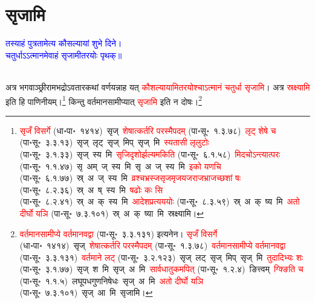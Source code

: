 \section[सृजामि]{सृजामि}
\centering\textcolor{blue}{तस्याहं पुत्रतामेत्य कौसल्यायां शुभे दिने।\nopagebreak\\
चतुर्धाऽऽत्मानमेवाहं सृजामीतरयोः पृथक्॥}\nopagebreak\\
\\
\fontsize{14}{21}\selectfont\begin{sloppypar}\justifying\noindent\hspace{10mm} अत्र भगवाञ्छ्रीरामभद्रोऽवतार\-कथां वर्णयन्नाह यत् \textcolor{red}{कौशल्यायामितरयोश्चाऽत्मानं चतुर्धा सृजामि}। अत्र \textcolor{red}{स्रक्ष्यामि} इति हि पाणिनीयम्।\footnote{\textcolor{red}{सृजँ विसर्गे} (धा॰पा॰~१४१४)~\arrow सृज्~\arrow \textcolor{red}{शेषात्कर्तरि परस्मैपदम्} (पा॰सू॰~१.३.७८)~\arrow \textcolor{red}{लृट् शेषे च} (पा॰सू॰~३.३.१३)~\arrow सृज्~लृट्~\arrow सृज्~मिप्~\arrow सृज्~मि~\arrow \textcolor{red}{स्यतासी लृलुटोः} (पा॰सू॰~३.१.३३)~\arrow सृज्~स्य~मि~\arrow \textcolor{red}{सृजि\-दृशोर्झल्यमकिति} (पा॰सू॰~६.१.५८)~\arrow \textcolor{red}{मिदचोऽन्त्यात्परः} (पा॰सू॰~१.१.४७)~\arrow सृ~अम्~ज्~स्य~मि~\arrow सृ~अ~ज्~स्य~मि~\arrow \textcolor{red}{इको यणचि} (पा॰सू॰~६.१.७७)~\arrow स्र्~अ~ज्~स्य~मि~\arrow \textcolor{red}{व्रश्चभ्रस्ज\-सृजमृज\-यजराज\-भ्राजच्छशां षः} (पा॰सू॰~८.२.३६)~\arrow स्र्~अ~ष्~स्य~मि~\arrow \textcolor{red}{षढोः कः सि} (पा॰सू॰~८.२.४१)~\arrow स्र्~अ~क्~स्य~मि~\arrow \textcolor{red}{आदेश\-प्रत्यययोः} (पा॰सू॰~८.३.५९)~\arrow स्र्~अ~क्~ष्य~मि~\arrow \textcolor{red}{अतो दीर्घो यञि} (पा॰सू॰~७.३.१०१)~\arrow स्र्~अ~क्~ष्या~मि~\arrow स्रक्ष्यामि।} किन्तु वर्तमान\-सामीप्यात् \textcolor{red}{सृजामि} इति न दोषः।\footnote{\textcolor{red}{वर्तमान\-सामीप्ये वर्तमानवद्वा} (पा॰सू॰~३.३.१३१) इत्यनेन। \textcolor{red}{सृजँ विसर्गे} (धा॰पा॰~१४१४)~\arrow सृज्~\arrow \textcolor{red}{शेषात्कर्तरि परस्मैपदम्} (पा॰सू॰~१.३.७८)~\arrow \textcolor{red}{वर्तमान\-सामीप्ये वर्तमानवद्वा} (पा॰सू॰~३.३.१३१)~\arrow \textcolor{red}{वर्तमाने लट्} (पा॰सू॰~३.२.१२३)~\arrow सृज्~लट्~\arrow सृज्~मिप्~\arrow सृज्~मि~\arrow \textcolor{red}{तुदादिभ्यः शः} (पा॰सू॰~३.१.७७)~\arrow सृज्~श~मि~\arrow सृज्~अ~मि~\arrow \textcolor{red}{सार्वधातुकमपित्} (पा॰सू॰~१.२.४)~\arrow ङित्त्वम्~\arrow \textcolor{red}{ग्क्ङिति च} (पा॰सू॰~१.१.५)~\arrow लघूपध\-गुण\-निषेधः~\arrow सृज्~अ~मि~\arrow \textcolor{red}{अतो दीर्घो यञि} (पा॰सू॰~७.३.१०१)~\arrow सृज्~आ~मि~\arrow सृजामि।}\end{sloppypar}
